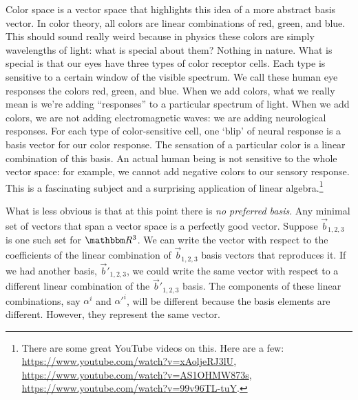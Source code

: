 \documentclass[12pt]{article}
\begin{document}
\begin{example}
Color space is a vector space that highlights this idea of a more abstract basis vector. In color theory, all colors are linear combinations of red, green, and blue. This should sound really weird because in physics these colors are simply wavelengths of light: what is special about them? Nothing in nature. What is special is that our eyes have three types of color receptor cells. Each type is sensitive to a certain window of the visible spectrum. We call these human eye responses the colors red, green, and blue. When we add colors, what we really mean is we're adding ``responses'' to a particular spectrum of light. When we add colors, we are not adding electromagnetic waves: we are adding neurological responses. For each type of color-sensitive cell, one `blip' of neural response is a basis vector for our color response. The sensation of a particular color is a linear combination of this basis. An actual human being is not sensitive to the whole vector space: for example, we cannot add negative colors to our sensory response. This is a fascinating subject and a surprising application of linear algebra.\footnote{There are some great YouTube videos on this. Here are a few: \url{https://www.youtube.com/watch?v=xAoljeRJ3lU}, \url{https://www.youtube.com/watch?v=AS1OHMW873s}, \url{https://www.youtube.com/watch?v=99v96TL-tuY}.}
\end{example}


What is less obvious is that at this point there is \emph{no preferred basis}. Any minimal set of vectors that span a vector space is a perfectly good vector. Suppose $\vec{b}_{1,2,3}$ is one such set for $\RR ^3$. We can write the vector with respect to the coefficients of the linear combination of  $\vec{b}_{1,2,3}$ basis vectors that reproduces it. If we had another basis, $\vec{b}'_{1,2,3}$, we could write the same vector with respect to a different linear combination of the $\vec{b}'_{1,2,3}$ basis. The components of these linear combinations, say $\alpha^i$ and $\alpha'^i$, will be different because the basis elements are different. However, they represent the same vector.
\end{document}
